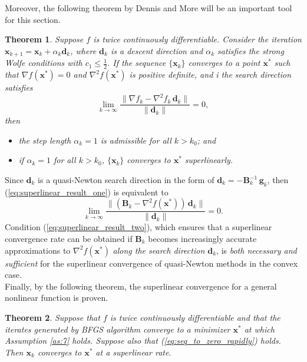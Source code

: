 \documentclass[11pt]{article}
\newtheorem{theorem}{Theorem}[section]
\begin{document}
Moreover, the following theorem by Dennis and More \cite{Dennis-More} will be an important tool for this section.
\begin{theorem}
\label{th:superlinearl_qn}
Suppose $f$ is twice continuously differentiable. Consider the iteration $\mathbf{x}_{k+1}=\mathbf{x}_k + \alpha_k \mathbf{d}_k$, where $\mathbf{d}_k$ is a descent direction and $\alpha_k$ satisfies the strong Wolfe conditions with $c_1 \leq \frac{1}{2}$. If the sequence $\{ \mathbf{x}_k\}$ converges to a point $\mathbf{x^*}$ such that $\nabla f (\mathbf{x}^*) = 0$ and $\nabla^2 f(\mathbf{x}^*)$ is positive definite, and i the search direction satisfies
\begin{equation}
\label{eq:superlinear_result_one}
      \lim_{k\to\infty} \frac{\| \nabla f_k - \nabla^2 f_k \, \mathbf{d}_k\|}{\| \mathbf{d}_k\|} = 0,
\end{equation}
then
\begin{itemize}
    \item the step length $\alpha_k = 1$ is admissible for all $k>k_0$; and
    \item if $\alpha_k = 1$ for all $k>k_0$, $\{ \mathbf{x}_k\}$ converges to $\mathbf{x}^*$ superlinearly. 
\end{itemize}
\end{theorem}
Since $\mathbf{d}_k$ is a quasi-Newton search direction in the form of $\mathbf{d}_k = - \mathbf{B}_k^{-1} \, \mathbf{g}_k$, then (\ref{eq:superlinear_result_one}) is equivalent to
\begin{equation}
\label{eq:superlinear_result_two}
      \lim_{k\to\infty} \frac{\| (\mathbf{B}_k - \nabla^2 f(\mathbf{x}^*)) \, \mathbf{d}_k\|}{\| \mathbf{d}_k\|} = 0.
\end{equation}
Condition (\ref{eq:superlinear_result_two}), which ensures that a superlinear convergence rate can be obtained if $\mathbf{B}_k$ becomes increasingly accurate approximations to $\nabla^2 f(\mathbf{x}^*)$ \emph{along the search direction $\mathbf{d}_k$}, is \emph{both necessary and sufficient} for the superlinear convergence of quasi-Newton methods in the convex case.\\

Finally, by the following theorem, the superlinear convergence for a general nonlinear function is proven.

\begin{theorem}
\label{th:superlinearl_nonconvex}
Suppose that $f$ is twice continuously differentiable and that the iterates generated by BFGS algorithm converge to a minimizer $\mathbf{x^*}$ at which Assumption \ref{as:7} holds. Suppose also that (\ref{eq:seq_to_zero_rapidly}) holds. Then $\mathbf{x}_k$ converges to $\mathbf{x^*}$ at a superlinear rate.
\end{theorem}
\end{document}
